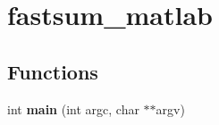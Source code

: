 \hypertarget{group__applications__fastsum__matlab}{
\section{fastsum\_\-matlab}
\label{group__applications__fastsum__matlab}
}
\subsection*{Functions}
\begin{CompactItemize}
\item 
\hypertarget{group__applications__fastsum__matlab_ga0}{
int {\bf main} (int argc, char $\ast$$\ast$argv)}
\label{group__applications__fastsum__matlab_ga0}

\end{CompactItemize}

